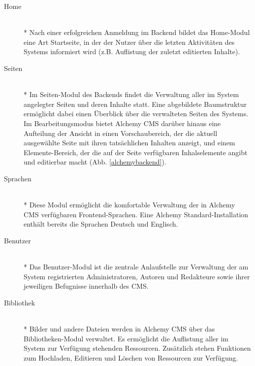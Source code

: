 \begin{description}
\item[Home]\mbox{~}\\*
Nach einer erfolgreichen Anmeldung im Backend bildet das Home-Modul eine Art Startseite, in der der Nutzer über die letzten Aktivitäten des Systems informiert wird (z.B. Auflistung der zuletzt editierten Inhalte).
\item[Seiten]\mbox{~}\\*
Im Seiten-Modul des Backends findet die Verwaltung aller im System angelegter Seiten und deren Inhalte statt. Eine abgebildete Baumstruktur ermöglicht dabei einen Überblick über die verwalteten Seiten des Systems. Im Bearbeitungsmodus bietet Alchemy CMS darüber hinaus eine Aufteilung der Ansicht in einen Vorschaubereich, der die aktuell ausgewählte Seite mit ihren tatsächlichen Inhalten anzeigt, und einem Elemente-Bereich, der die auf der Seite verfügbaren Inhalselemente angibt und editierbar macht (Abb. \ref{alchemybackend}).
\item[Sprachen]\mbox{~}\\*
Diese Modul ermöglicht die komfortable Verwaltung der in Alchemy CMS verfügbaren Frontend-Sprachen. Eine Alchemy Standard-Installation enthält bereits die Sprachen Deutsch und Englisch.
\item[Benutzer]\mbox{~}\\*
Das Benutzer-Modul ist die zentrale Anlaufstelle zur Verwaltung der am System registrierten Administratoren, Autoren und Redakteure sowie ihrer jeweiligen Befugnisse innerhalb des CMS.
\item[Bibliothek]\mbox{~}\\*
Bilder und andere Dateien werden in Alchemy CMS über das Bibliotheken-Modul verwaltet. Es ermöglicht die Auflistung aller im System zur Verfügung stehenden Ressourcen. Zusätzlich stehen Funktionen zum Hochladen, Editieren und Löschen von Ressourcen zur Verfügung.
\end{description}
